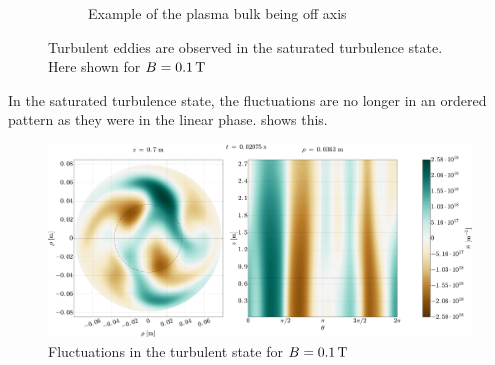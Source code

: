 \begin{figure}[htbp]
\begin{subfigure}[h]{1.00\textwidth}
        \caption{Example of the plasma bulk being off axis}
        \label{fig:offcenter}
    \end{subfigure}
    \caption{Turbulent eddies are observed in the saturated turbulence state.
    Here shown for $B=0.1\, \text{T}$}
\end{figure}
%
In the saturated turbulence state, the fluctuations are no longer in an ordered pattern as they were in the linear phase.
 shows this.
%
\begin{figure}[htb]
    \centering
    \includegraphics[width=1.0\textwidth]{fig/results/2DTurbulence/fluct}
    \caption{Fluctuations in the turbulent state for $B=0.1\, \text{T}$}
    \label{fig:2DFluct}
\end{figure}
%
